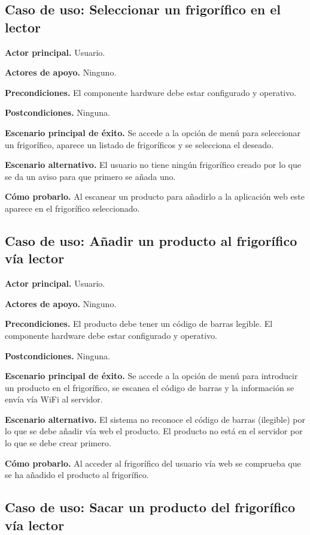 \subsection{Caso de uso: Seleccionar un frigorífico en el lector}

    \textbf{Actor principal.} Usuario.

    \textbf{Actores de apoyo.} Ninguno.

    \textbf{Precondiciones.} El componente hardware debe estar configurado y operativo.

    \textbf{Postcondiciones.} Ninguna.

    \textbf{Escenario principal de éxito.} Se accede a la opción de menú para seleccionar un frigorífico, aparece un listado de frigoríficos y se selecciona el deseado.

    \textbf{Escenario alternativo.} El usuario no tiene ningún frigorífico creado por lo que se da un aviso para que primero se añada uno.

    \textbf{Cómo probarlo.} Al escanear un producto para añadirlo a la aplicación web este aparece en el frigorífico seleccionado.

\subsection{Caso de uso: Añadir un producto al frigorífico vía lector}

    \textbf{Actor principal.} Usuario.

    \textbf{Actores de apoyo.} Ninguno.

    \textbf{Precondiciones.} El producto debe tener un código de barras legible. El componente hardware debe estar configurado y operativo.

    \textbf{Postcondiciones.} Ninguna.

    \textbf{Escenario principal de éxito.} Se accede a la opción de menú para introducir un producto en el frigorífico, se escanea el código de barras y la información se envía vía WiFi al servidor.

    \textbf{Escenario alternativo.} El sistema no reconoce el código de barras (ilegible) por lo que se debe añadir vía web el producto. El producto no está en el servidor por lo que se debe crear primero.

    \textbf{Cómo probarlo.} Al acceder al frigorífico del usuario vía web se comprueba que se ha añadido el producto al frigorífico.

\subsection{Caso de uso: Sacar un producto del frigorífico vía lector}

